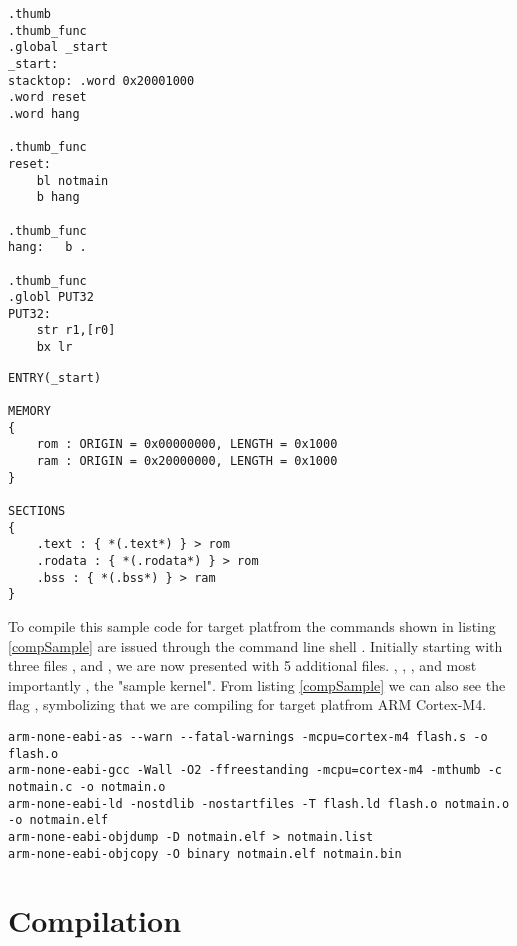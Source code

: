 \begin{lstlisting}[style=ASS, caption={flash.s}, float, floatplacement=H]
.thumb
.thumb_func
.global _start
_start:
stacktop: .word 0x20001000
.word reset
.word hang

.thumb_func
reset:
    bl notmain
    b hang

.thumb_func
hang:   b .

.thumb_func
.globl PUT32
PUT32:
    str r1,[r0]
    bx lr
\end{lstlisting}

\begin{lstlisting}[style=LD, caption={flash.ld}, float, floatplacement=H]
ENTRY(_start)

MEMORY
{
    rom : ORIGIN = 0x00000000, LENGTH = 0x1000
    ram : ORIGIN = 0x20000000, LENGTH = 0x1000
}

SECTIONS
{
    .text : { *(.text*) } > rom
    .rodata : { *(.rodata*) } > rom
    .bss : { *(.bss*) } > ram
}
\end{lstlisting}

To compile this sample code for target platfrom the commands shown in listing \ref{compSample} are issued through the command line shell . Initially starting with three files ,  and , we are now presented with 5 additional files. , , ,  and most importantly , the "sample kernel". From listing \ref{compSample} we can also see the flag , symbolizing that we are compiling for target platfrom ARM Cortex-M4.

\begin{lstlisting}[style=SH, caption=Compiling sample code with gcc-arm-none-eabi toolchain, label=compSample, float, floatplacement=H]
arm-none-eabi-as --warn --fatal-warnings -mcpu=cortex-m4 flash.s -o flash.o
arm-none-eabi-gcc -Wall -O2 -ffreestanding -mcpu=cortex-m4 -mthumb -c notmain.c -o notmain.o
arm-none-eabi-ld -nostdlib -nostartfiles -T flash.ld flash.o notmain.o -o notmain.elf
arm-none-eabi-objdump -D notmain.elf > notmain.list
arm-none-eabi-objcopy -O binary notmain.elf notmain.bin
\end{lstlisting}

\section{Compilation}

